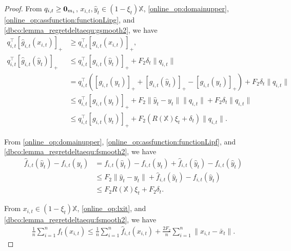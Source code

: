 \documentclass[12pt,draftcls,onecolumn]{IEEEtran}%
\begin{document}
\begin{proof}
From $q_{i,t}\ge{\bf 0}_{m_i}$, $x_{i,t},\hat{y}_{t}\in(1-\xi_t)\mathbb{X}$, \eqref{online_op:domainupper}, \eqref{online_op:assfunction:functionLipg}, and \eqref{dbco:lemma_regretdeltaequ:gsmooth2}, we have
\begin{align}
q_{i,t}^\top [\hat{g}_{i,t}(x_{i,t})]_+&\ge q_{i,t}^\top [g_{i,t}(x_{i,t})]_+,\label{dbco:lemma_regretdelta:equ1_g2}\\
q_{i,t}^\top[\hat{g}_{i,t}(\hat{y}_{t})]_+&\le q_{i,t}^\top[g_{i,t}(\hat{y}_{t})]_++ F_2\delta_{t}\|q_{i,t}\|\nonumber\\
&=q_{i,t}^\top([g_{i,t}(y_{t})]_++[g_{i,t}(\hat{y}_{t})]_+-[g_{i,t}(y_{t})]_+)+ F_2\delta_{t}\|q_{i,t}\|\nonumber\\
&\le q_{i,t}^\top[g_{i,t}(y_{t})]_++F_2\|\hat{y}_{t}-y_{t}\|\|q_{i,t}\|+ F_2\delta_{t}\|q_{i,t}\|\nonumber\\
&\le q_{i,t}^\top[g_{i,t}(y_{t})]_++F_2(R(\mathbb{X})\xi_{t}+ \delta_{t})\|q_{i,t}\|.\label{dbco:lemma_regretdelta:equ1_g}
\end{align}

From \eqref{online_op:domainupper}, \eqref{online_op:assfunction:functionLipf}, and \eqref{dbco:lemma_regretdeltaequ:fsmooth2}, we have
\begin{align}
\hat{f}_{i,t}(\hat{y}_{t})-f_{i,t}(y_{t})
&=f_{i,t}(\hat{y}_{t})-f_{i,t}(y_{t})
+\hat{f}_{i,t}(\hat{y}_{t})-f_{i,t}(\hat{y}_{t})\nonumber\\
&\le F_2\|\hat{y}_{t}-y_{t}\|+\hat{f}_{i,t}(\hat{y}_{t})-f_{i,t}(\hat{y}_{t})\nonumber\\
&\le F_2R(\mathbb{X})\xi_{t}+ F_2\delta_{t}.\label{dbco:lemma_regretdelta:equ1}
\end{align}

From $x_{i,t}\in(1-\xi_t)\mathbb{X}$, \eqref{online_op:lxit}, and \eqref{dbco:lemma_regretdeltaequ:fsmooth2}, we have
\begin{align}\label{online_op:lxit_bandit}
\frac{1}{n}\sum_{i=1}^{n}f_t(x_{i,t})
\le\frac{1}{n}\sum_{i=1}^{n}\hat{f}_{i,t}(x_{i,t})+\frac{2F_2}{n}\sum_{i=1}^{n}
\|x_{i,t}-\bar{x}_{t}\|.
\end{align}


\end{proof}
\end{document}
